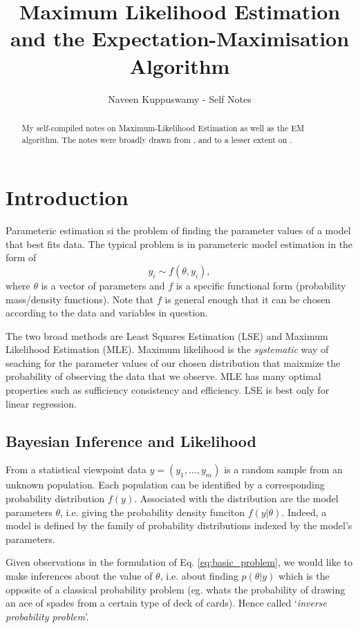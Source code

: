 \documentclass[a4paper,10pt]{article}
\title{Maximum Likelihood Estimation and the Expectation-Maximisation Algorithm}
\author{Naveen Kuppuswamy - Self Notes}
\date{}
\begin{document}
\maketitle

\begin{abstract}
My self-compiled notes on Maximum-Likelihood Estimation as well as the EM algorithm. The notes were broadly drawn from \cite{Myung2003}, \cite{Chen2010} and to a lesser extent on \cite{Murphy2012}.

\end{abstract}
\section{Introduction}
Parameteric estimation si the problem of finding the parameter values of a model that best fits data. The typical problem is in parameteric model estimation in the form of 
\begin{equation}
 y_i \sim f(\theta,y_i),
 \label{eq:basic_problem}
\end{equation}
where $\theta$ is a vector of parameters and $f$ is a specific functional form (probability mass/density functions). Note that $f$ is general enough that it can be chosen according to the data and variables in question.

The two broad methods are Least Squares Estimation (LSE) and Maximum Likelihood Estimation (MLE). Maximum likelihood is the \emph{systematic} way of seaching for the parameter values of our chosen distribution that maixmize the probability of observing the data that we observe. MLE has many optimal properties such as sufficiency consistency and efficiency. LSE is best only for linear regression. 

\subsection{Bayesian Inference and Likelihood}

From a statistical viewpoint data $y = (y_1,\ldots,y_m)$ is a random sample from an unknown population. Each population can be identified by a corresponding probability distribution $f(y)$. Associated with the distribution are the model parameters $\theta$, i.e. giving the probability density funciton $f(y|\theta)$. Indeed, a model is defined by the family of probability distributions indexed by the model's parameters. 

Given observations in the formulation of Eq. \eqref{eq:basic_problem}, we would like to make inferences about the value of $\theta$, i.e. about finding $p(\theta|y)$ which is the opposite of a classical probability problem (eg. whats the probability of drawing an ace of spades from a certain type of deck of cards). Hence called `\emph{inverse probability problem}'.
\end{document}
